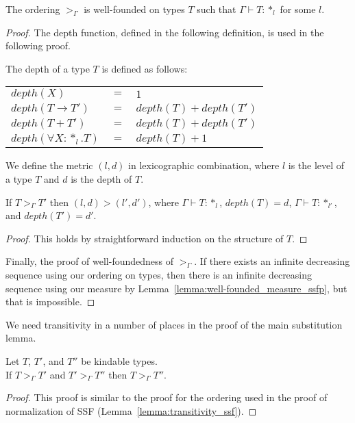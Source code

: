 \begin{thm}
  The ordering $>_\Gamma$ is well-founded on types $T$ such that 
  $\Gamma \vdash T:*_l$ for some $l$.
  \label{thm:well-founded_ordering_ssfp}
\end{thm}
\begin{proof}
  The depth function, defined in the following definition, is used in the following proof.

  \begin{definition}
    The depth of a type $T$ is defined as follows:
    \begin{center}
      \begin{tabular}{lll}
        $depth(X)$                  & $=$ & $1$\\
        $depth(T \to T')$     & $=$ & $depth(T) + depth(T')$\\
        $depth(T + T')$       & $=$ & $depth(T) + depth(T')$\\
        $depth(\forall X:*_l.T)$ & $=$ & $depth(T) + 1$\\
      \end{tabular}
    \end{center}
  \end{definition}

  We define the metric $(l,d)$ in lexicographic combination, where $l$
  is the level of a type $T$ and $d$ is the depth of $T$.

  \begin{lemma}
    \label{lemma:well-founded_measure_ssfp}
    If $T >_\Gamma T'$ then $(l,d) > (l',d')$, where $\Gamma \vdash T:*_l$, 
    $depth(T) = d$,  $\Gamma \vdash T:*_{l'}$, and $depth(T') = d'$.
  \end{lemma}
  \begin{proof}
    This holds by straightforward induction on the structure of
    $T$. 
  \end{proof}
  
  Finally, the proof of well-foundedness of $>_\Gamma$.  If there exists
  an infinite decreasing sequence using our ordering on types, then there
  is an infinite decreasing sequence using our measure by
  Lemma~\ref{lemma:well-founded_measure_ssfp}, but that is impossible.
\end{proof}
\noindent
We need transitivity in a number of places in the proof of the main
substitution lemma.  

\begin{lemma}
  Let $T$, $T'$, and $T''$ be kindable types.  \\
  If $T >_\Gamma T'$ and $T' >_\Gamma T''$ then $T >_\Gamma T''$.
  \label{lemma:transitivity_ssfp}
\end{lemma}
\begin{proof}
  This proof is similar to the proof for the ordering used in the
  proof of normalization of SSF (Lemma~\ref{lemma:transitivity_ssf}).
\end{proof}

